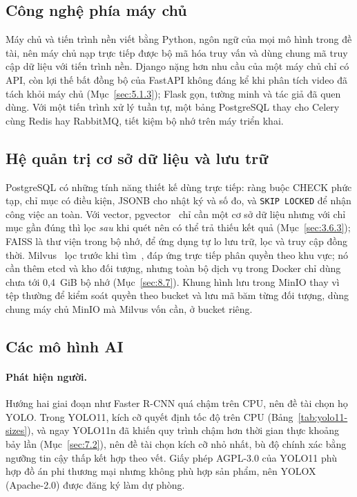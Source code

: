 \subsection{Công nghệ phía máy chủ}
\label{sec:6.1.2}

Máy chủ và tiến trình nền viết bằng Python, ngôn ngữ của mọi mô hình trong đề tài, nên máy chủ nạp trực tiếp được bộ mã hóa truy vấn và dùng chung mã truy cập dữ liệu với tiến trình nền. Django nặng hơn nhu cầu của một máy chủ chỉ có API, còn lợi thế bất đồng bộ của FastAPI không đáng kể khi phân tích video đã tách khỏi máy chủ (Mục~\ref{sec:5.1.3}); Flask gọn, tường minh và tác giả đã quen dùng. Với một tiến trình xử lý tuần tự, một bảng PostgreSQL thay cho Celery cùng Redis hay RabbitMQ, tiết kiệm bộ nhớ trên máy triển khai.

\subsection{Hệ quản trị cơ sở dữ liệu và lưu trữ}
\label{sec:6.1.3}

PostgreSQL có những tính năng thiết kế dùng trực tiếp: ràng buộc CHECK phức tạp, chỉ mục có điều kiện, JSONB cho nhật ký và số đo, và \texttt{SKIP LOCKED} để nhận công việc an toàn. Với vector, pgvector~\cite{pgvector2026} chỉ cần một cơ sở dữ liệu nhưng với chỉ mục gần đúng thì lọc \emph{sau} khi quét nên có thể trả thiếu kết quả (Mục~\ref{sec:3.6.3}); FAISS là thư viện trong bộ nhớ, để ứng dụng tự lo lưu trữ, lọc và truy cập đồng thời. Milvus~\cite{wang2021milvus} lọc trước khi tìm~\cite{milvus2026filtered}, đáp ứng trực tiếp phân quyền theo khu vực; nó cần thêm etcd và kho đối tượng, nhưng toàn bộ dịch vụ trong Docker chỉ dùng chưa tới 0,4~GiB bộ nhớ (Mục~\ref{sec:8.7}). Khung hình lưu trong MinIO thay vì tệp thường để kiểm soát quyền theo bucket và lưu mã băm từng đối tượng, dùng chung máy chủ MinIO mà Milvus vốn cần, ở bucket riêng.

\subsection{Các mô hình AI}
\label{sec:6.1.4}

\paragraph{Phát hiện người.} Hướng hai giai đoạn như Faster R-CNN quá chậm trên CPU, nên đề tài chọn họ YOLO. Trong YOLO11, kích cỡ quyết định tốc độ trên CPU (Bảng~\ref{tab:yolo11-sizes}), và ngay YOLO11n đã khiến quy trình chậm hơn thời gian thực khoảng bảy lần (Mục~\ref{sec:7.2}), nên đề tài chọn kích cỡ nhỏ nhất, bù độ chính xác bằng ngưỡng tin cậy thấp kết hợp theo vết. Giấy phép AGPL-3.0 của YOLO11 phù hợp đồ án phi thương mại nhưng không phù hợp sản phẩm, nên YOLOX~\cite{ge2021yolox} (Apache-2.0) được đăng ký làm dự phòng.

